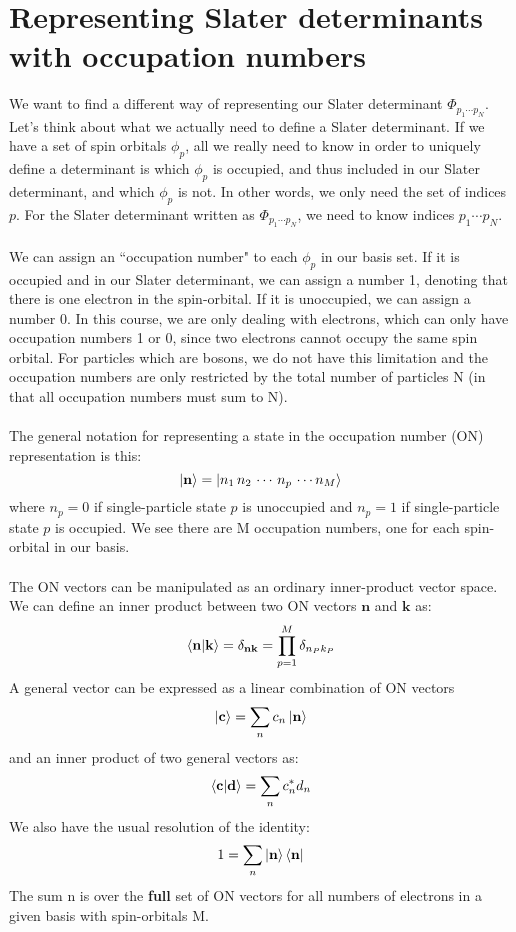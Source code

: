 \documentclass{article}
\def\*#1{\mathbf{#1}}
\begin{document}
\section{Representing Slater determinants with occupation numbers}
We want to find a different way of representing our Slater determinant $\Phi_{p_1 \cdots p_N}$. 
Let's think about what we actually need to define a Slater determinant. 
If we have a set of spin orbitals $\phi_p$, all we really need to know in order to uniquely define a determinant is which $\phi_p$ is occupied, and thus included in our Slater determinant, and which $\phi_p$ is not. 
In other words, we only need the set of indices $p$. 
For the Slater determinant written as $\Phi_{p_1 \cdots p_N}$, we need to know indices $p_1 \cdots p_N$.
\\ \\
We can assign an ``occupation number" to each $\phi_p$ in our basis set.
If it is occupied and in our Slater determinant, we can assign a number 1, denoting that there is one electron in the spin-orbital.
If it is unoccupied, we can assign a number 0.
In this course, we are only dealing with electrons, which can only have occupation numbers 1 or 0, since two electrons cannot occupy the same spin orbital. 
For particles which are bosons, we do not have this limitation and the occupation numbers are only restricted by the total number of particles N (in that all occupation numbers must sum to N).  \\
\\
The general notation for representing a state in the occupation number (ON) representation is this: 
\[\ket{\*{n}} = \ket{n_1 \, n_2 \, \cdots \,  n_p \, \cdots n_M}\] 
where $n_p = 0$ if single-particle state $p$ is unoccupied and $n_p = 1$ if single-particle state $p$ is occupied. We see there are M occupation numbers, one for each spin-orbital in our basis.\\
\\ 
The ON vectors can be manipulated as an ordinary inner-product vector space. 
We can define an inner product between two ON vectors $\*{n}$ and $\*{k}$ as: 
\[\braket{\*{n} | \*{k}} = \delta_{\*{n} \*{k}} = \prod_{p = 1}^M \delta_{n_Pk_P}\]
A general vector can be expressed as a linear combination of ON vectors
\[\ket{\*{c}} = \sum_n c_n \ket{\*{n}} \]
and an inner product of two general vectors as: 
\[\braket{\*{c}| \*{d}} = \sum_n c_n^*d_n \]
We also have the usual resolution of the identity: 
\[1 = \sum_n \ket{\*{n}}\bra{\*{n}} \]
The sum n is over the \textbf{full} set of ON vectors for all numbers of electrons in a given basis with spin-orbitals M. 
\end{document}

